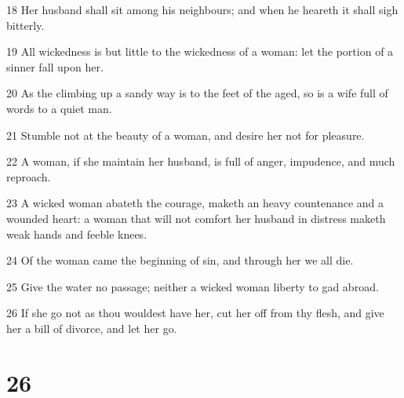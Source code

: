 \par 18 Her husband shall sit among his neighbours; and when he heareth it shall sigh bitterly.
\par 19 All wickedness is but little to the wickedness of a woman: let the portion of a sinner fall upon her.
\par 20 As the climbing up a sandy way is to the feet of the aged, so is a wife full of words to a quiet man.
\par 21 Stumble not at the beauty of a woman, and desire her not for pleasure.
\par 22 A woman, if she maintain her husband, is full of anger, impudence, and much reproach.
\par 23 A wicked woman abateth the courage, maketh an heavy countenance and a wounded heart: a woman that will not comfort her husband in distress maketh weak hands and feeble knees.
\par 24 Of the woman came the beginning of sin, and through her we all die.
\par 25 Give the water no passage; neither a wicked woman liberty to gad abroad.
\par 26 If she go not as thou wouldest have her, cut her off from thy flesh, and give her a bill of divorce, and let her go.

\chapter{26}

